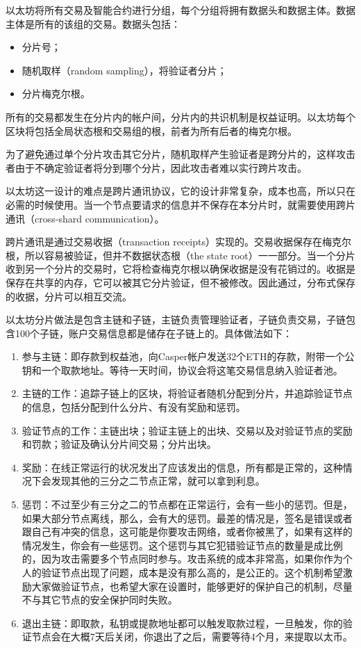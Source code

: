 \documentclass[a4paper,12pt]{article}
\begin{document}
以太坊将所有交易及智能合约进行分组，每个分组将拥有数据头和数据主体。数据主体是所有的该组的交易。数据头包括：

\begin{itemize}
\item 分片号；
\item 随机取样（random sampling），将验证者分片；
\item 分片梅克尔根。
\end{itemize}

所有的交易都发生在分片内的帐户间，分片内的共识机制是权益证明。以太坊每个区块将包括全局状态根和交易组的根，前者为所有后者的梅克尔根。

为了避免通过单个分片攻击其它分片，随机取样产生验证者是跨分片的，这样攻击者由于不确定验证者将分到哪个分片，因此攻击者难以实行跨片攻击。

以太坊这一设计的难点是跨片通讯协议，它的设计非常复杂，成本也高，所以只在必需的时候使用。当一个节点要请求的信息并不保存在本分片时，就需要使用跨片通讯（cross-shard communication）。

跨片通讯是通过交易收据（transaction receipts）实现的。交易收据保存在梅克尔根，所以容易被验证，但并不数据状态根（the state root）一一部分。当一个分片收到另一个分片的交易时，它将检查梅克尔根以确保收据是没有花销过的。收据是保存在共享的内存，它可以被其它分片验证，但不被修改。因此通过，分布式保存的收据，分片可以相互交流。

以太坊分片做法是包含主链和子链，主链负责管理验证者，子链负责交易，子链包含100个子链，账户交易信息都是储存在子链上的。具体做法如下：
\begin{enumerate}
\item 参与主链：即存款到权益池，向Casper帐户发送32个ETH的存款，附带一个公钥和一个取款地址。等待一天时间，协议会将这笔交易信息纳入验证者池。
\item 主链的工作：追踪子链上的区块，将验证者随机分配到分片，并追踪验证节点的信息，包括分配到什么分片、有没有奖励和惩罚。
\item 验证节点的工作：主链出块；验证主链上的出块、交易以及对验证节点的奖励和罚款；验证及确认分片间交易；分片出块。
\item 奖励：在线正常运行的状况发出了应该发出的信息，所有都是正常的，这种情况下会发现其他的三分之二节点正常，就可以拿到利息。
\item 惩罚：不过至少有三分之二的节点都在正常运行，会有一些小的惩罚。但是，如果大部分节点离线，那么，会有大的惩罚。最差的情况是，签名是错误或者跟自己有冲突的信息，这可能是你要攻击网络，或者你被黑了，如果有这样的情况发生，你会有一些惩罚。这个惩罚与其它犯错验证节点的数量是成比例的，因为攻击需要多个节点同时参与。攻击系统的成本非常高，如果你作为个人的验证节点出现了问题，成本是没有那么高的，是公正的。这个机制希望激励大家做验证节点，也希望大家在设置时，能够更好的保护自己的机制，尽量不与其它节点的安全保护同时失败。
\item 退出主链：即取款，私钥或提款地址都可以触发取款过程，一旦触发，你的验证节点会在大概7天后关闭，你退出了之后，需要等待4个月，来提取以太币。
\end{enumerate}
\end{document}
